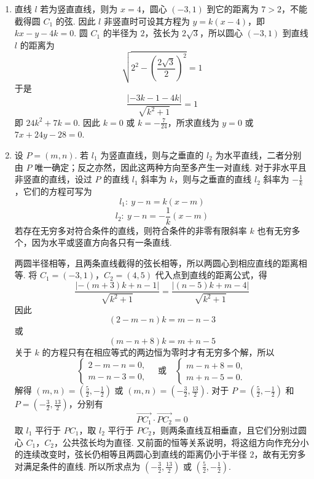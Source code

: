 \begin{solution}
\begin{enumerate}
\item 直线 \(l\) 若为竖直直线，则为 \(x=4\)，圆心 \((-3,1)\) 到它的距离为 \(7>2\)，不能截得圆 \(C_1\) 的弦. 因此 \(l\) 非竖直时可设其方程为 \(y=k(x-4)\)，即 \(kx-y-4k=0\). 圆 \(C_1\) 的半径为 \(2\)，弦长为 \(2\sqrt3\)，所以圆心 \((-3,1)\) 到直线 \(l\) 的距离为
\[
\sqrt{2^2-\left(\frac{2\sqrt3}{2}\right)^2}=1
\]
于是
\[
\frac{|-3k-1-4k|}{\sqrt{k^2+1}}=1
\]
即 \(24k^2+7k=0\). 因此 \(k=0\) 或 \(k=-\frac{7}{24}\)，所求直线为 \(y=0\) 或 \(7x+24y-28=0\).

\item 设 \(P=(m,n)\). 若 \(l_1\) 为竖直直线，则与之垂直的 \(l_2\) 为水平直线，二者分别由 \(P\) 唯一确定；反之亦然，因此这两种方向至多产生一对直线. 对于非水平且非竖直的直线，设过 \(P\) 的直线 \(l_1\) 斜率为 \(k\)，则与之垂直的直线 \(l_2\) 斜率为 \(-\frac1k\)，它们的方程可写为
\[
l_1:\ y-n=k(x-m)
\]
\[
l_2:\ y-n=-\frac1k(x-m)
\]
若存在无穷多对符合条件的直线，则符合条件的非零有限斜率 \(k\) 也有无穷多个，因为水平或竖直方向各只有一条直线.

两圆半径相等，且两条直线截得的弦长相等，所以两圆心到相应直线的距离相等. 将 \(C_1=(-3,1)\)，\(C_2=(4,5)\) 代入点到直线的距离公式，得
\[
\frac{|-(m+3)k+n-1|}{\sqrt{k^2+1}}
=\frac{|(n-5)k+m-4|}{\sqrt{k^2+1}}
\]
因此
\[
(2-m-n)k=m-n-3
\]
或
\[
(m-n+8)k=m+n-5
\]
关于 \(k\) 的方程只有在相应等式的两边恒为零时才有无穷多个解，所以
\[
\begin{cases}
2-m-n=0,\\
m-n-3=0,
\end{cases}
\quad\text{或}\quad
\begin{cases}
m-n+8=0,\\
m+n-5=0.
\end{cases}
\]
解得 \((m,n)=\left(\frac52,-\frac12\right)\) 或 \((m,n)=\left(-\frac32,\frac{13}{2}\right)\).
对于 \(P=\left(\frac52,-\frac12\right)\) 和 \(P=\left(-\frac32,\frac{13}{2}\right)\)，分别有
\[
\overrightarrow{PC_1}\cdot\overrightarrow{PC_2}=0
\]
取 \(l_1\) 平行于 \(PC_1\)，取 \(l_2\) 平行于 \(PC_2\)，则两条直线互相垂直，且它们分别过圆心 \(C_1\)，\(C_2\)，公共弦长均为直径. 又前面的恒等关系说明，将这组方向作充分小的连续改变时，弦长仍相等且两圆心到直线的距离仍小于半径 \(2\)，故有无穷多对满足条件的直线. 所以所求点为 \(\left(-\frac32,\frac{13}{2}\right)\) 或 \(\left(\frac52,-\frac12\right)\).
\end{enumerate}
\end{solution}

